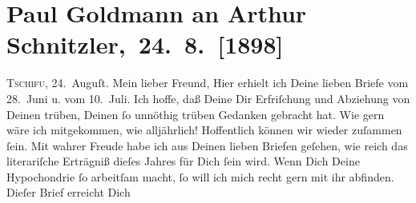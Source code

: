                \section[ Paul Goldmann an Arthur Schnitzler, 24. 8. {[}1898{]}]{ Paul Goldmann an Arthur Schnitzler, 24. 8. {[}1898{]}}\nopagebreak{}\rehead{ }\begin{ledgroupsized}[t]{13cm}\normalsize\beginnumbering \toendnotes[C]{\smallbreak\pagebreak[2]} 
\toendnotes[C]{\smallbreak}\pstart
           \raggedleft{}{\pb}\textsc{Tschifu}, 24. Auguſt.\pend
           \pstart\center{}Mein lieber Freund,\pend\pstart
           Hier erhielt ich Deine lieben Briefe vom 28. Juni u.
               vom 10. Juli. Ich hoffe, daß Deine \label{K_L02854-1v}\label{K_L02854-1h} Dir Erfriſchung und Abziehung von Deinen trüben, Deinen ſo unnöthig trüben
               Gedanken gebracht hat. Wie gern wäre ich \strikeout{\textcolor{gray}{mt}} mitgekommen, wie alljährlich! Hoffentlich können wir \label{K_L02854-2v}\label{K_L02854-2h} wieder zuſammen
               ſein.\pend
           \pstart
           Mit wahrer Freude habe ich aus Deinen lieben Briefen geſehen, wie reich das
               literariſche Erträgniß dieſes Jahres für Dich ſein wird.
               Wenn Dich Deine Hypochondrie {\pb}ſo arbeitſam macht, ſo
               will ich mich recht gern mit ihr  abfinden. Dieſer Brief erreicht Dich

\end{ledgroupsized}
